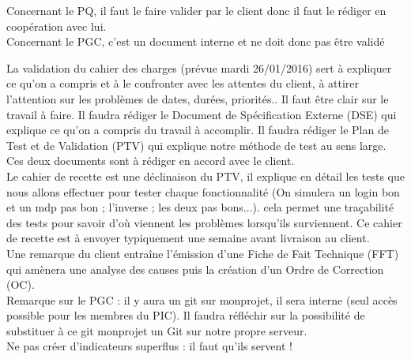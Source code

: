 \documentclass [a4paper] {article}
\begin{document}
Concernant le PQ, il faut le faire valider par le client donc il faut le rédiger en coopération avec lui.
\\
Concernant le PGC, c'est un document interne et ne doit donc pas être validé

La validation du cahier des charges (prévue mardi 26/01/2016) sert à expliquer ce qu'on a compris et à le confronter avec les attentes du client, à attirer l'attention sur les problèmes de dates, durées, priorités.. Il faut être clair sur le travail à faire.
Il faudra rédiger le Document de Spécification Externe (DSE) qui explique ce qu'on a compris du travail à accomplir. 
Il faudra rédiger le Plan de Test et de Validation (PTV) qui explique notre méthode de test au sens large.
Ces deux documents sont à rédiger en accord avec le client.
\\
Le cahier de recette est une déclinaison du PTV, il explique en détail les tests que nous allons effectuer pour tester chaque fonctionnalité (On simulera un login bon et un mdp pas bon ; l'inverse ; les deux pas bons...). cela permet une traçabilité des tests pour savoir d'où viennent les problèmes lorsqu'ils surviennent. Ce cahier de recette est à envoyer typiquement une semaine avant livraison au client.
\\
Une remarque du client entraîne l'émission d'une Fiche de Fait Technique (FFT) qui amènera une analyse des causes puis la création d'un Ordre de Correction (OC).
\\
Remarque sur le PGC : il y aura un git sur monprojet, il sera interne (seul accès possible pour les membres du PIC). Il faudra réfléchir sur la possibilité de substituer à ce git monprojet un Git sur notre propre serveur.
\\
Ne pas créer d'indicateurs superflus : il faut qu'ils servent !

\end{document}
